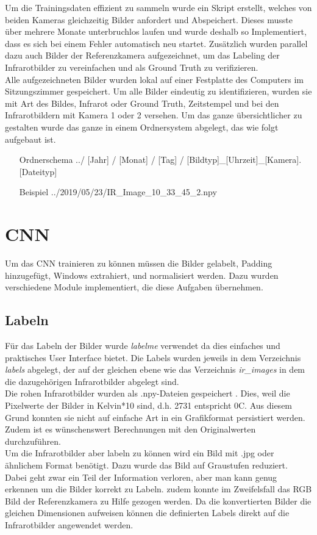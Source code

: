 Um die Trainingsdaten effizient zu sammeln wurde ein  Skript erstellt, welches von beiden Kameras gleichzeitig Bilder anfordert und Abspeichert. Dieses musste über mehrere Monate unterbruchlos laufen und wurde deshalb so Implementiert, dass es sich bei einem Fehler automatisch neu startet. Zusätzlich wurden parallel dazu auch Bilder der Referenzkamera aufgezeichnet, um das Labeling der Infrarotbilder zu vereinfachen und als Ground Truth zu verifizieren.\\
Alle aufgezeichneten Bilder wurden lokal auf einer Festplatte des Computers im Sitzungszimmer gespeichert. Um alle Bilder eindeutig zu identifizieren, wurden sie mit Art des Bildes, Infrarot oder Ground Truth, Zeitstempel und bei den Infrarotbildern mit Kamera 1 oder 2 versehen. Um das ganze übersichtlicher zu gestalten wurde das ganze in einem Ordnersystem abgelegt, das wie folgt aufgebaut ist.

\begin{itemize}[leftmargin=4cm, align=left, labelsep=*, labelwidth=*]
	\item[Ordnerschema] ../ [Jahr] / [Monat] / [Tag] / [Bildtyp]\_[Uhrzeit]\_[Kamera].[Dateityp]
	\item[Beispiel] ../2019/05/23/IR\_Image\_10\_33\_45\_2.npy
\end{itemize}


\section{CNN}

Um das \gls{CNN} trainieren zu können müssen die Bilder gelabelt, \gls{Padding} hinzugefügt, \glspl{Window} extrahiert, und normalisiert werden. Dazu wurden verschiedene Module implementiert, die diese Aufgaben übernehmen.

\subsection{Labeln}
\label{sec:labeling}

Für das Labeln der Bilder wurde \textit{labelme}\parencite{labelme2016} verwendet da dies einfaches und praktisches User Interface bietet. Die Labels wurden jeweils in dem Verzeichnis \textit{labels} abgelegt, der auf der gleichen ebene wie das Verzeichnis \textit{ir\_images} in dem die dazugehörigen Infrarotbilder abgelegt sind.\\
Die rohen Infrarotbilder wurden als .npy-Dateien gespeichert \parencite{npyformat}. Dies, weil die Pixelwerte der Bilder in Kelvin*10 sind, d.h. 2731 entspricht 0\degree C. Aus diesem Grund konnten sie nicht auf einfache Art in ein Grafikformat persistiert werden. Zudem ist es wünschenswert Berechnungen mit den Originalwerten durchzuführen.\\
Um die Infrarotbilder aber labeln zu können wird ein Bild mit .jpg oder ähnlichem Format benötigt. Dazu wurde das Bild auf Graustufen reduziert. Dabei geht zwar ein Teil der Information verloren, aber man kann genug erkennen um die Bilder korrekt zu Labeln. zudem konnte im Zweifelsfall das RGB Bild der Referenzkamera zu Hilfe gezogen werden. Da die konvertierten Bilder die gleichen Dimensionen aufweisen können die definierten Labels direkt auf die Infrarotbilder angewendet werden.

